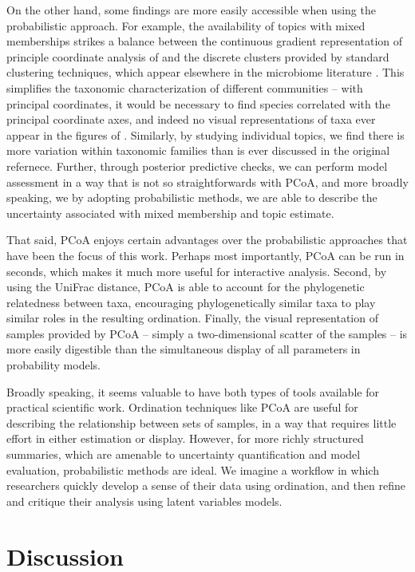 \documentclass[oupdraft]{bio}
\begin{document}
On the other hand, some findings are more easily accessible when using the
probabilistic approach. For example, the availability of topics with mixed
memberships strikes a balance between the continuous gradient representation of
principle coordinate analysis of \citep{dethlefsen2011incomplete} and the
discrete clusters provided by standard clustering techniques, which appear
elsewhere in the microbiome literature \citep{digiulio2015temporal,
  mcmurdie2014waste}. This simplifies the taxonomic characterization of
different communities -- with principal coordinates, it would be necessary to
find species correlated with the principal coordinate axes, and indeed no visual
representations of taxa ever appear in the figures of
\cite{dethlefsen2011incomplete}. Similarly, by studying individual topics, we
find there is more variation within taxonomic families than is ever discussed in
the original refernece. Further, through posterior predictive checks, we can
perform model assessment in a way that is not so straightforwards with PCoA, and
more broadly speaking, we by adopting probabilistic methods, we are able to
describe the uncertainty associated with mixed membership and topic estimate.

That said, PCoA enjoys certain advantages over the probabilistic approaches that
have been the focus of this work. Perhaps most importantly, PCoA can be run in
seconds, which makes it much more useful for interactive analysis. Second, by
using the UniFrac distance, PCoA is able to account for the phylogenetic
relatedness between taxa, encouraging phylogenetically similar taxa to play
similar roles in the resulting ordination. Finally, the visual representation of
samples provided by PCoA -- simply a two-dimensional scatter of the samples --
is more easily digestible than the simultaneous display of all parameters in
probability models.

Broadly speaking, it seems valuable to have both types of tools available for
practical scientific work. Ordination techniques like PCoA are useful for
describing the relationship between sets of samples, in a way that requires
little effort in either estimation or display. However, for more richly
structured summaries, which are amenable to uncertainty quantification and model
evaluation, probabilistic methods are ideal. We imagine a workflow in which
researchers quickly develop a sense of their data using ordination, and then
refine and critique their analysis using latent variables models.

\section{Discussion}
\end{document}
